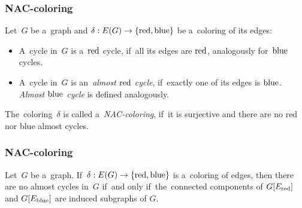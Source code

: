 \documentclass[aspectratio=\myaspectratio]{beamer}
\begin{document}
\begin{frame}
	\frametitle{NAC-coloring}
	\begin{definition}
		Let~\( G \) be a~graph and \( \delta: E(G) \to \{ \text{red}, \text{blue} \} \)
		be a~coloring of its edges:
		\begin{itemize}
			\item A~cycle in~\( G \) is a~\( \text{red} \) cycle, if~all its edges are \( \text{red} \),
			      analogously for~\( \text{blue} \) cycles.
			\item A~cycle in~\( G \) is an~\emph{almost \( \text{red} \) cycle},
			      if~exactly one of its edges is \( \text{blue} \).
			      \emph{Almost \( \text{blue} \) cycle} is defined analogously.
		\end{itemize}
		The~coloring~\( \delta \) is called a~\emph{NAC-coloring}, if~it is surjective
		and there are no red nor blue almost cycles.
	\end{definition}
\end{frame}
\begin{frame}
	\frametitle{NAC-coloring}
	\begin{lemma}%
		Let~\( G \) be a~graph. If~\( \delta: E(G) \to \{ \text{red}, \text{blue} \} \) is a~coloring of edges,
		then there are no almost cycles in~\( G \) if~and only if~the~connected components
		of \( G[E_{\text{red}}] \) and \( G[E_{\text{blue}}] \)%
		are induced subgraphs of \( G \).
	\end{lemma}
\end{frame}
\end{document}
